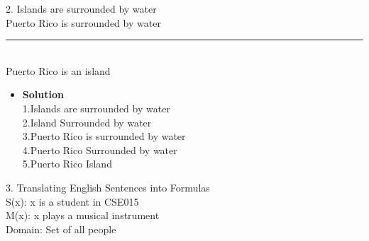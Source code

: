 \documentclass[11pt]{article}
\begin{document}
\begin{enumerate}

\begin{flushleft}
{\large 2. Islands are surrounded by water \\
\large \hspace{.4cm} Puerto Rico is surrounded by water \\
\large\noindent\rule{7cm}{0.4pt} \\
\large Puerto Rico is an island}
\end{flushleft}
\end {enumerate}


\begin{itemize}

\item \textbf{Solution}\\
\large 1.\hspace{.2cm}Islands are surrounded by water \\
\large 2.\hspace{.2cm}Island \rightarrow Surrounded\hspace{.2cm} by \hspace{.2cm}water \\
\large 3.\hspace{.2cm}Puerto \hspace{.2cm}Rico\hspace{.2cm} is\hspace{.2cm} surrounded \hspace{.2cm}by \hspace{.2cm}water \\
\large 4.\hspace{.2cm}Puerto Rico \rightarrow Surrounded by water \\
\large 5.\hspace{.2cm}Puerto Rico \rightarrow Island

\end {itemize}







\begin{flushleft}
{\Large 3. Translating English Sentences into Formulas}\\
\large \hspace{1cm}S(x): x is a student in CSE015\\
\large \hspace{1cm}M(x): x plays a musical instrument\\
\large \hspace{1cm}Domain: Set of all people

\end{flushleft}
\end{document}
